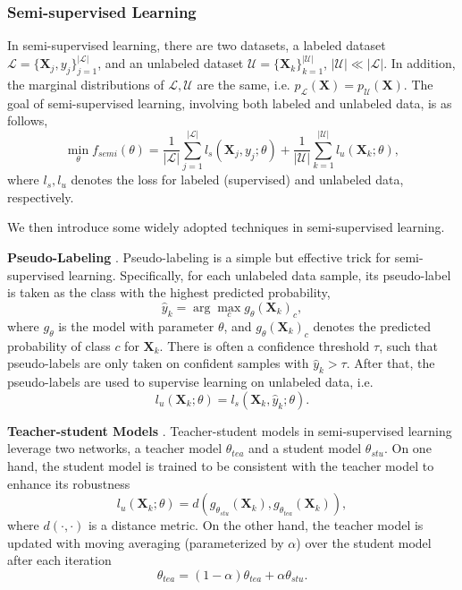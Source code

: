 \documentclass[11pt]{article}
\begin{document}
\subsubsection{Semi-supervised Learning}\label{sec:prelim-semi}
In semi-supervised learning, there are two datasets, a labeled dataset $\mathcal{L} = \{\mathbf{X}_j, y_j\}_{j=1}^{|\mathcal{L}|}$, and an unlabeled dataset $\mathcal{U} = \{\mathbf{X}_k\}_{k=1}^{|\mathcal{U}|}$, $|\mathcal{U}|\ll |\mathcal{L}|$. In addition, the marginal distributions of $\mathcal{L}, \mathcal{U}$ are the same, i.e. $p_\mathcal{L}(\mathbf{X})=p_\mathcal{U}(\mathbf{X})$. The goal of semi-supervised learning, involving both labeled and unlabeled data, is as follows, 
\begin{equation}
\min_\theta f_{semi}(\theta) = \frac{1}{|\mathcal{L}|}\sum_{j=1}^{|\mathcal{L}|}l_s(\mathbf{X}_j, y_j;\theta)+\frac{1}{|\mathcal{U}|}\sum_{k=1}^{|\mathcal{U}|}l_u(\mathbf{X}_k;\theta),
\label{eqn:semi}
\end{equation}
where $l_s, l_u$ denotes the loss for labeled (supervised) and unlabeled data, respectively. 

We then introduce some widely adopted techniques in semi-supervised learning. 

\textbf{Pseudo-Labeling} \cite{lee2013pseudo}. Pseudo-labeling is a simple but effective trick for semi-supervised learning. Specifically, for each unlabeled data sample, its pseudo-label is taken as the class with the highest predicted probability, 
\begin{equation}
    \hat{y}_k = \arg\max_{c} g_\theta(\mathbf{X}_k)_c, 
\end{equation}
where $g_\theta$ is the model with parameter $\theta$, and $g_\theta(\mathbf{X}_k)_c$ denotes the predicted probability of class $c$ for $\mathbf{X}_k$. There is often a confidence threshold $\tau$, such that pseudo-labels are only taken on confident samples with $\hat{y}_k>\tau$. After that, the pseudo-labels are used to supervise learning on unlabeled data, i.e. 
\begin{equation}
    l_u(\mathbf{X}_k;\theta) = l_s(\mathbf{X}_k, \hat{y}_k;\theta).
\end{equation}

\textbf{Teacher-student Models} \cite{tarvainen2017mean}. Teacher-student models in semi-supervised learning leverage two networks, a teacher model $\theta_{tea}$ and a student model $\theta_{stu}$. On one hand, the student model is trained to be consistent with the teacher model to enhance its robustness 
\begin{equation}
    l_u(\mathbf{X}_k;\theta) = d\left(g_{\theta_{stu}}(\mathbf{X}_k), g_{\theta_{tea}}(\mathbf{X}_k)\right),
\end{equation}
where $d(\cdot, \cdot)$ is a distance metric. On the other hand, the teacher model is updated with moving averaging (parameterized by $\alpha$) over the student model after each iteration
\begin{equation}
\theta_{tea} =(1-\alpha)\theta_{tea} + \alpha \theta_{stu}.
\label{eqn:ema}
\end{equation}
\end{document}
